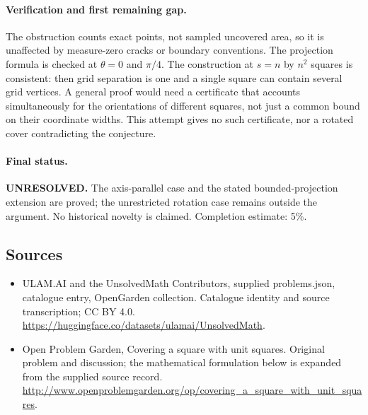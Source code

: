\documentclass[11pt,a4paper]{article}
\begin{document}
\paragraph{Verification and first remaining gap.}
The obstruction counts exact points, not sampled uncovered area, so it is
unaffected by measure-zero cracks or boundary conventions. The projection
formula is checked at $\theta=0$ and $\pi/4$. The construction at $s=n$ by
$n^2$ squares is consistent: then grid separation is one and a single square
can contain several grid vertices. A general proof would need a certificate
that accounts simultaneously for the orientations of different squares,
not just a common bound on their coordinate widths. This attempt gives no
such certificate, nor a rotated cover contradicting the conjecture.

\paragraph{Final status.}
\textbf{UNRESOLVED.} The axis-parallel case and the stated bounded-projection
extension are proved; the unrestricted rotation case remains outside the
argument. No historical novelty is claimed. Completion estimate: 5\%.

\subsection{Sources}
\begin{itemize}
\item[S1] ULAM.AI and the UnsolvedMath Contributors, supplied problems.json, catalogue entry, OpenGarden collection. Catalogue identity and source transcription; CC BY 4.0.
\url{https://huggingface.co/datasets/ulamai/UnsolvedMath}.
\item[S2] Open Problem Garden, Covering a square with unit squares. Original problem and discussion; the mathematical formulation below is expanded from the supplied source record.
\url{http://www.openproblemgarden.org/op/covering_a_square_with_unit_squares}.

\end{itemize}
\end{document}
